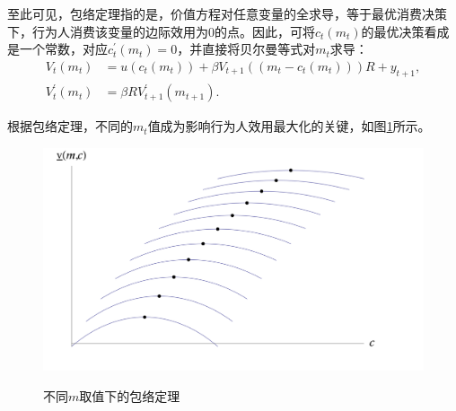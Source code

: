 至此可见，包络定理指的是，价值方程对任意变量的全求导，等于最优消费决策下，行为人消费该变量的边际效用为$0$的点。因此，可将$c_{t}\left(m_{t} \right)$的最优决策看成是一个常数，对应$c_{t}^{'} \left( m_{t} \right) = 0$，并直接将贝尔曼等式对$m_{t}$求导：
\begin{align}
  \label{eq:dp-growth-value-self}
  V_{t} \left( m_{t} \right) & = u \left( c_{t} \left( m_{t} \right) \right) + \beta V_{t+1} \left(
  \left( m_{t} - c_{t} \left(m_{t} \right) \right)
  \right) R + y_{t+1}, \\
  \label{eq:dp-growth-value-drv}
  V_{t}^{'} \left( m_{t} \right) & = \beta R V_{t+1}^{'} \left( m_{t+1} \right).
\end{align}

根据包络定理，不同的$m_{t}$值成为影响行为人效用最大化的关键，如图\ref{fig:dp-growth-envelope}所示。
\begin{figure}[htbp]
   \caption{不同$m$取值下的包络定理}
  \centering
  \includegraphics[width=15cm]{./Figures/20180212-envelope-theorem}
  \label{fig:dp-growth-envelope}
%
\end{figure}
